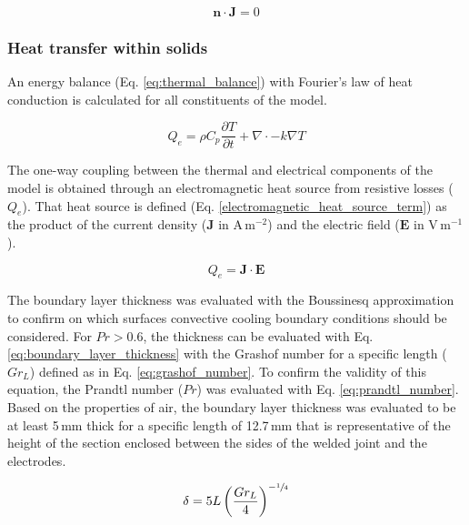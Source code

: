 \begin{equation}
\mathbf{n} \cdot \mathbf{J} = 0
\label{electrical_insulation}
\end{equation}

\subsubsection{Heat transfer within solids}

An energy balance (Eq. \ref{eq:thermal_balance}) with Fourier’s law of heat conduction is calculated for all constituents of the model. 

\begin{equation}
Q_e= \rho C_p \frac{\partial T}{\partial t} + \nabla \cdot -k \nabla T
\label{eq:thermal_balance}
\end{equation}

The one-way coupling between the thermal and electrical components of the model is obtained through an electromagnetic heat source from resistive losses ($Q_e$).  
That heat source is defined (Eq. \ref{electromagnetic_heat_source_term}) as the product of the current density ($\mathbf{J}$ in \mbox{A\,m$^{-2}$}) and the electric field ($\mathbf{E}$ in \mbox{V\,m$^{-1}$}). 

\begin{equation}
Q_e =  \mathbf{J} \cdot \mathbf{E} 
\label{electromagnetic_heat_source_term}
\end{equation}

The boundary layer thickness was evaluated with the Boussinesq approximation to confirm on which surfaces convective cooling boundary conditions should be considered. 
For $Pr > 0.6 $, the thickness can be evaluated with Eq. \ref{eq:boundary_layer_thickness} with the Grashof number for a specific length ($Gr_L$) defined as in Eq. \ref{eq:grashof_number}. 
To confirm the validity of this equation, the Prandtl number ($Pr$) was evaluated with Eq. \ref{eq:prandtl_number}. 
Based on the properties of air, the boundary layer thickness was evaluated to be at least \mbox{5\,mm} thick for a specific length of \mbox{12.7\,mm} that is representative of the height of the section enclosed between the sides of the welded joint and the electrodes. 

\begin{equation}
\delta = 5 L \left( \frac{Gr_L}{4} \right)^{-\sfrac{1}{4} }
\label{eq:boundary_layer_thickness}
\end{equation}


